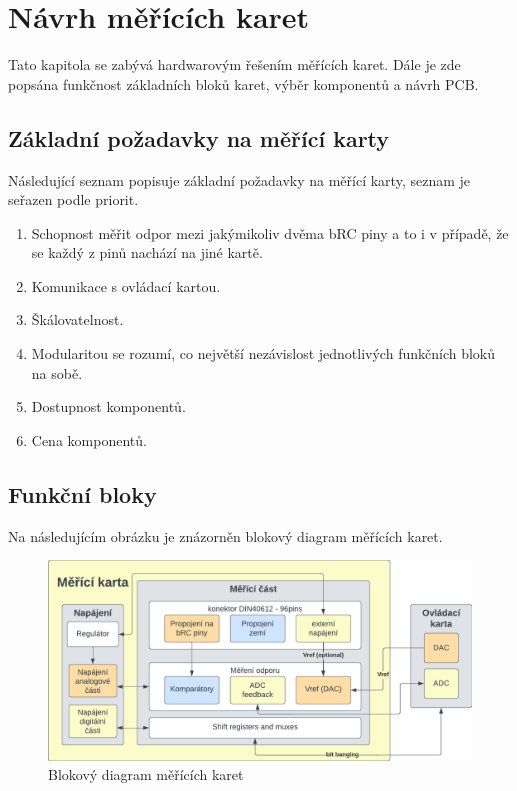     \chapter{Návrh měřících karet}
    Tato kapitola se zabývá hardwarovým řešením měřících karet. Dále je zde popsána funkčnost základních bloků karet, výběr komponentů a návrh PCB.

    \section{Základní požadavky na měřící karty}
    Následující seznam popisuje základní požadavky na měřící karty, seznam je seřazen podle priorit.
    \begin{enumerate}
        \item Schopnost měřit odpor mezi jakýmikoliv dvěma bRC piny a to i v případě, že se každý z pinů nachází na jiné kartě.
        \item Komunikace s ovládací kartou.
        \item Škálovatelnost.
        \item Modularitou se rozumí, co největší nezávislost jednotlivých funkčních bloků na sobě.
        \item Dostupnost komponentů. 
        \item Cena komponentů. 
    \end{enumerate}

    \section{Funkční bloky}
    Na následujícím obrázku je znázorněn blokový diagram měřících karet.
    \begin{figure}[ht!]
            \centering
            \includegraphics[width = 1\textwidth]{obrazky/karta_system_diagram.png}
            \caption{Blokový diagram měřících karet}
            \label{fig:Blokový diagram měřících karet}
    \end{figure}


